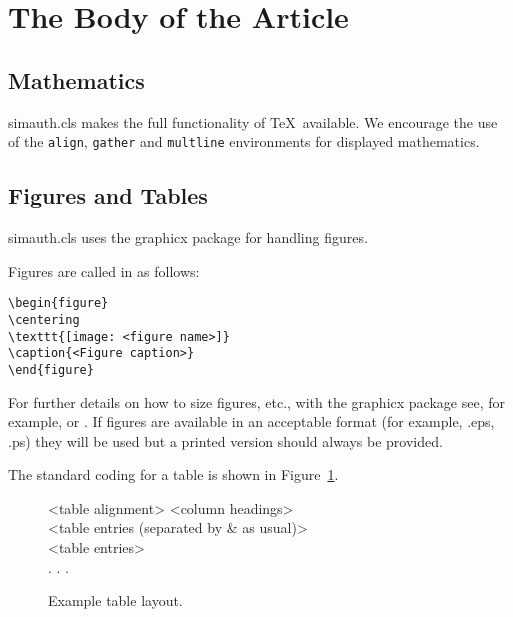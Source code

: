 \documentclass[times]{simauth}
\begin{document}

\section{The Body of the Article}

\subsection{Mathematics} \textsf{simauth.cls} makes the full
functionality of \AmS\/\TeX\ available. We encourage the use of
the \verb"align", \verb"gather" and \verb"multline" environments
for displayed mathematics.

\subsection{Figures and Tables} \textsf{simauth.cls} uses the
\textsf{graphicx} package for handling figures.

Figures are called in as follows:
\begin{verbatim}
\begin{figure}
\centering
\texttt{[image: <figure name>]}
\caption{<Figure caption>}
\end{figure}
\end{verbatim}

For further details on how to size figures, etc., with the
\textsf{graphicx} package see, for example, \cite{R1}
or \cite{R3}. If figures are available in an
acceptable format (for example, .eps, .ps) they will be used but a
printed version should always be provided. \medbreak

The standard coding for a table is shown in Figure~\ref{F2}.

\begin{figure}
\setlength{\fboxsep}{0pt}%
\setlength{\fboxrule}{0pt}%
\begin{center}
\begin{boxedverbatim}
\begin{table}
\caption{<Table caption>}
\centering
\begin{tabular}{<table alignment>}
\toprule
<column headings>\\
\midrule
<table entries
(separated by & as usual)>\\
<table entries>\\
.
.
.\\
\bottomrule
\end{tabular}
\end{table}
\end{boxedverbatim}
\end{center}
\caption{Example table layout.\label{F2}}
\end{figure}
\end{document}
